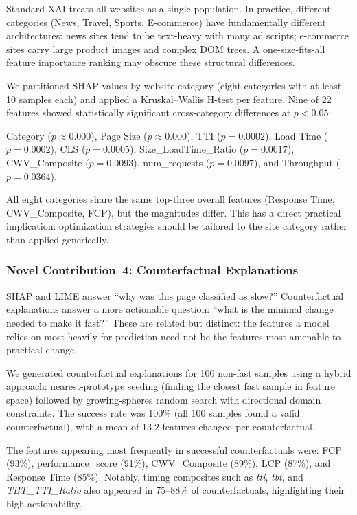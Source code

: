 \documentclass[sn-nature]{sn-jnl}
\begin{document}
Standard XAI treats all websites as a single population. In practice, different categories (News, Travel, Sports, E-commerce) have fundamentally different architectures: news sites tend to be text-heavy with many ad scripts; e-commerce sites carry large product images and complex DOM trees. A one-size-fits-all feature importance ranking may obscure these structural differences.

We partitioned SHAP values by website category (eight categories with at least 10 samples each) and applied a Kruskal--Wallis H-test per feature. Nine of 22 features showed statistically significant cross-category differences at $p < 0.05$:

Category ($p \approx 0.000$), Page Size ($p \approx 0.000$), TTI ($p = 0.0002$), Load Time ($p = 0.0002$), CLS ($p = 0.0005$), Size\_LoadTime\_Ratio ($p = 0.0017$), CWV\_Composite ($p = 0.0093$), num\_requests ($p = 0.0097$), and Throughput ($p = 0.0364$).

All eight categories share the same top-three overall features (Response Time, CWV\_Composite, FCP), but the magnitudes differ. This has a direct practical implication: optimization strategies should be tailored to the site category rather than applied generically.

\subsubsection{Novel Contribution~4: Counterfactual Explanations}

SHAP and LIME answer ``why was this page classified as slow?'' Counterfactual explanations answer a more actionable question: ``what is the minimal change needed to make it fast?'' These are related but distinct: the features a model relies on most heavily for prediction need not be the features most amenable to practical change.

We generated counterfactual explanations for 100 non-fast samples using a hybrid approach: nearest-prototype seeding (finding the closest fast sample in feature space) followed by growing-spheres random search with directional domain constraints. The success rate was 100\% (all 100 samples found a valid counterfactual), with a mean of 13.2 features changed per counterfactual.

The features appearing most frequently in successful counterfactuals were: FCP (93\%), performance\_score (91\%), CWV\_Composite (89\%), LCP (87\%), and Response Time (85\%). Notably, timing composites such as \textit{tti}, \textit{tbt}, and \textit{TBT\_TTI\_Ratio} also appeared in 75--88\% of counterfactuals, highlighting their high actionability.
\end{document}

